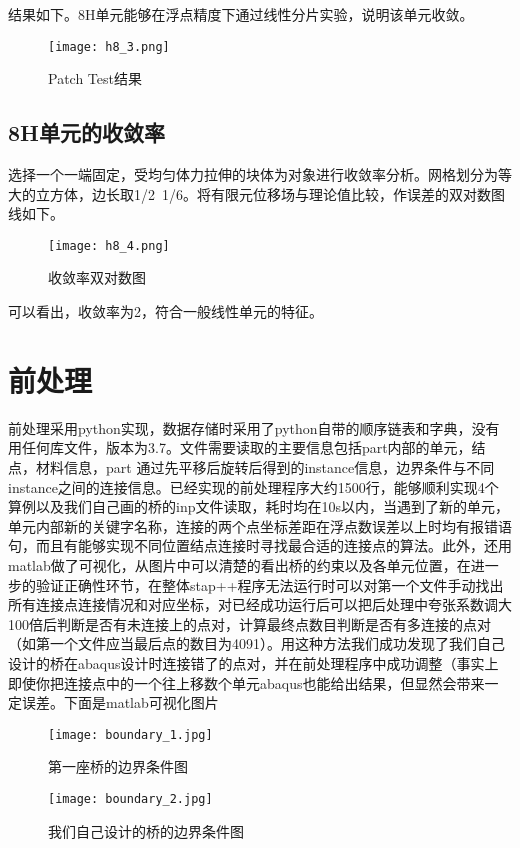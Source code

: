 \documentclass[forprint]{WHUBachelor}
\begin{document}
结果如下。8H单元能够在浮点精度下通过线性分片实验，说明该单元收敛。

\begin{figure}[H]
\centering  
\texttt{[image: h8\_3.png]} 
\caption{Patch Test结果} 
\label{f2.3} 
\end{figure}

\subsection{8H单元的收敛率}
选择一个一端固定，受均匀体力拉伸的块体为对象进行收敛率分析。网格划分为等大的立方体，边长取1/2~1/6。将有限元位移场与理论值比较，作误差的双对数图线如下。
\begin{figure}[H]
\centering  
\texttt{[image: h8\_4.png]} 
\caption{收敛率双对数图} 
\label{f2.4} 
\end{figure}

可以看出，收敛率为2，符合一般线性单元的特征。
\section{前处理}
前处理采用python实现，数据存储时采用了python自带的顺序链表和字典，没有用任何库文件，版本为3.7。文件需要读取的主要信息包括part内部的单元，结点，材料信息，part 通过先平移后旋转后得到的instance信息，边界条件与不同instance之间的连接信息。已经实现的前处理程序大约1500行，能够顺利实现4个算例以及我们自己画的桥的inp文件读取，耗时均在10s以内，当遇到了新的单元，单元内部新的关键字名称，连接的两个点坐标差距在浮点数误差以上时均有报错语句，而且有能够实现不同位置结点连接时寻找最合适的连接点的算法。此外，还用matlab做了可视化，从图片中可以清楚的看出桥的约束以及各单元位置，在进一步的验证正确性环节，在整体stap++程序无法运行时可以对第一个文件手动找出所有连接点连接情况和对应坐标，对已经成功运行后可以把后处理中夸张系数调大100倍后判断是否有未连接上的点对，计算最终点数目判断是否有多连接的点对（如第一个文件应当最后点的数目为4091）。用这种方法我们成功发现了我们自己设计的桥在abaqus设计时连接错了的点对，并在前处理程序中成功调整（事实上即使你把连接点中的一个往上移数个单元abaqus也能给出结果，但显然会带来一定误差。下面是matlab可视化图片
\begin{figure}[H]
\centering  
\texttt{[image: boundary\_1.jpg]} 
\caption{第一座桥的边界条件图} 
\label{f3.1} 
\end{figure}
\begin{figure}[H]
\centering  
\texttt{[image: boundary\_2.jpg]} 
\caption{我们自己设计的桥的边界条件图} 
\label{f3.2} 
\end{figure}
\end{document}
